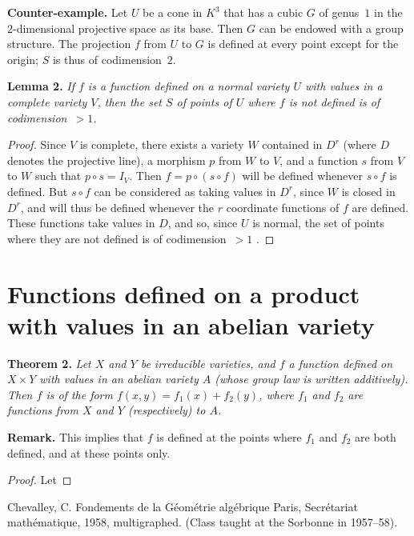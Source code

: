 \documentclass{article}
\newenvironment{itenv}[1]
  {\phantomsection\par\medskip\noindent\textbf{#1.}\itshape}
  {\medskip}
\newenvironment{rmenv}[1]
  {\phantomsection\par\medskip\noindent\textbf{#1.}\rmfamily}
  {\medskip}
\newcommand{\oldpage}[1]{\marginpar{\footnotesize$\Big\vert$ \textit{p.~#1}}}
\begin{document}
\begin{rmenv}{Counter-example}
  Let $U$ be a cone in $K^3$ that has a cubic $G$ of genus~$1$ in the $2$-dimensional projective space as its base.
  Then $G$ can be endowed with a group structure.
  The projection $f$ from $U$ to $G$ is defined at every point except for the origin;
  $S$ is thus of codimension~$2$.
\end{rmenv}

\begin{itenv}{Lemma 2}
\label{lemma2}
  If $f$ is a function defined on a normal variety $U$ with values in a complete variety $V$, then the set $S$ of points of $U$ where $f$ is not defined is of codimension~$>1$.
\end{itenv}

\begin{proof}
  Since $V$ is complete, there exists a variety $W$ contained in $D^r$ (where $D$ denotes the projective line), a morphism $p$ from $W$ to $V$, and a function $s$ from $V$ to $W$ such that $p\circ s=I_V$.
  Then $f=p\circ(s\circ f)$ will be defined whenever $s\circ f$ is defined.
  But $s\circ f$ can be considered as taking values in $D^r$, since $W$ is closed in $D^r$, and will thus be defined whenever the $r$ coordinate functions of $f$ are defined.
  These functions take values in $D$, and so, since $U$ is normal, the set of points where they are not defined is of codimension~$>1$ \cite[p.~166, Corollary to Proposition~2, Section~1, Chapter~V]{1}.
\end{proof}


\section{Functions defined on a product with values in an abelian variety}
\label{4}

\begin{itenv}{Theorem 2}
\label{theorem2}
  Let $X$ and $Y$ be irreducible varieties, and $f$ a function defined on $X\times Y$ with values in an abelian variety $A$ (whose group law is written additively).
  Then $f$ is of the form $f(x,y)=f_1(x)+f_2(y)$, where $f_1$ and $f_2$ are functions from $X$ and $Y$ (respectively) to $A$.
\end{itenv}

\begin{rmenv}{Remark}
  This implies that $f$ is defined at the points where $f_1$ and $f_2$ are both defined, and at these points only.
\end{rmenv}

\oldpage{9-05}
\begin{proof}
  Let
\end{proof}




\nocite{*}

\begin{thebibliography}{1}

  {\sc Chevalley, C.}
  \newblock Fondements de la G\'{e}om\'{e}trie alg\'{e}brique
  \newblock Paris, Secr\'{e}tariat math\'{e}matique, 1958, multigraphed.
  \newblock (Class taught at the Sorbonne in 1957--58).

\end{thebibliography}
\end{document}
